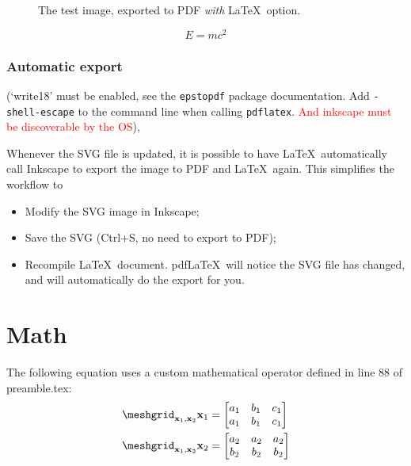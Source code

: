 \begin{figure}
\centering
    
    \caption{The test image, exported to PDF \emph{with} \LaTeX\ option.}
    \label{fig:pdflatex}
\end{figure}

\begin{equation}
    \label{eq:emc2}
    E = mc^{2}
\end{equation}

\subsubsection{Automatic export}

(`write18' must be enabled, see the {\small\verb|epstopdf|} package
documentation. Add {\small\verb|-shell-escape|} to the command line when calling
{\small\verb|pdflatex|}. \textcolor{red}{And inkscape must be discoverable by the
OS}),

Whenever the SVG file is updated, it is possible to have \LaTeX\ automatically call Inkscape to export the image to PDF and \LaTeX\ again. This simplifies the workflow to
\begin{itemize}
	\item Modify the SVG image in Inkscape;
	\item Save the SVG (Ctrl+S, no need to export to PDF);
	\item Recompile \LaTeX\ document. pdf\LaTeX\ will notice the SVG file has changed, and will automatically do the export for you.
\end{itemize}

\section{Math}

The following equation uses a custom mathematical operator defined in line 88
of preamble.tex:
\begin{equation}
\begin{aligned}
            \meshgrid_{\mathbf{x}_{1},\mathbf{x}_{2}}\mathbf{x}_{1}&=
            \begin{bmatrix}a_{1} & b_{1} & c_{1}\\
            a_{1} & b_{1} & c_{1}
\end{bmatrix}\\
            \meshgrid_{\mathbf{x}_{1},\mathbf{x}_{2}}\mathbf{x}_{2}&=
            \begin{bmatrix}a_{2} & a_{2} & a_{2}\\
            b_{2} & b_{2} & b_{2}
\end{bmatrix}
\end{aligned}
\end{equation}

